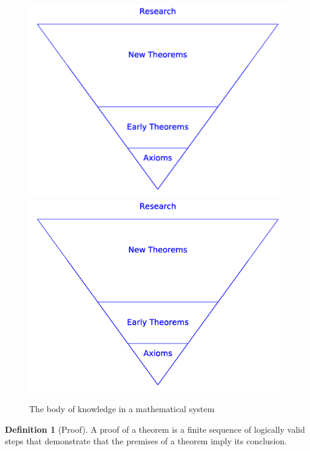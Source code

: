 \documentclass[10pt,]{book}
\theoremstyle{plain}
\theoremstyle{definition}
\newtheorem{definition}[theorem]{Definition}
\theoremstyle{definition}
\theoremstyle{definition}
\theoremstyle{definition}
\begin{document}
\begin{figure}
\centering
{}%
{\includegraphics[width=1\linewidth]{images/pyramid.pdf}}%
{\includegraphics[width=1\linewidth]{images/pyramid.png}}
\caption{The body of knowledge in a mathematical system \label{knowledge-pyramid}}
\end{figure}
\begin{definition}[Proof]\label{def-proof}
 A proof of a theorem is a finite sequence of logically valid steps that demonstrate that the premises of a theorem imply its conclusion.%
\end{definition}
\par
\end{document}
